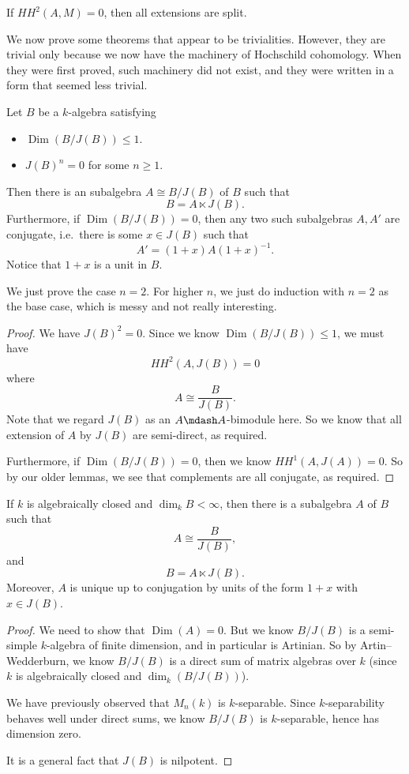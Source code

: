 \documentclass[a4paper]{article}
\DeclareMathOperator\Dim{Dim}
\newcommand\HH{H\!H}
\begin{document}
\begin{cor}
  If $\HH^2(A, M) = 0$, then all extensions are split.
\end{cor}

We now prove some theorems that appear to be trivialities. However, they are trivial only because we now have the machinery of Hochschild cohomology. When they were first proved, such machinery did not exist, and they were written in a form that seemed less trivial.
\begin{thm}
  Let $B$ be a $k$-algebra satisfying
  \begin{itemize}
    \item $\Dim (B/J(B)) \leq 1$.
    \item $J(B)^n = 0$ for some $n \geq 1$.
  \end{itemize}
  Then there is an subalgebra $A \cong B/J(B)$ of $B$ such that
  \[
    B = A \ltimes J(B).
  \]
  Furthermore, if $\Dim (B/J(B)) = 0$, then any two such subalgebras $A, A'$ are conjugate, i.e.\ there is some $x \in J(B)$ such that
  \[
    A' = (1 + x) A (1 + x)^{-1}.
  \]
  Notice that $1 + x$ is a unit in $B$.
\end{thm}

We just prove the case $n = 2$. For higher $n$, we just do induction with $n = 2$ as the base case, which is messy and not really interesting.

\begin{proof}
  We have $J(B)^2 = 0$. Since we know $\Dim (B/J(B)) \leq 1$, we must have
  \[
    \HH^2(A, J(B)) = 0
  \]
  where
  \[
    A \cong \frac{B}{J(B)}.
  \]
  Note that we regard $J(B)$ as an $A\mdash A$-bimodule here. So we know that all extension of $A$ by $J(B)$ are semi-direct, as required.

  Furthermore, if $\Dim (B/J(B)) = 0$, then we know $\HH^1(A, J(A)) = 0$. So by our older lemmas, we see that complements are all conjugate, as required.
\end{proof}

\begin{cor}
  If $k$ is algebraically closed and $\dim_k B < \infty$, then there is a subalgebra $A$ of $B$ such that
  \[
    A \cong \frac{B}{J(B)},
  \]
  and
  \[
    B = A \ltimes J(B).
  \]
  Moreover, $A$ is unique up to conjugation by units of the form $1 + x$ with $x \in J(B)$.
\end{cor}

\begin{proof}
  We need to show that $\Dim (A) = 0$. But we know $B/J(B)$ is a semi-simple $k$-algebra of finite dimension, and in particular is Artinian. So by Artin--Wedderburn, we know $B/J(B)$ is a direct sum of matrix algebras over $k$ (since $k$ is algebraically closed and $\dim_k(B/J(B))$).

  We have previously observed that $M_n(k)$ is $k$-separable. Since $k$-separability behaves well under direct sums, we know $B/J(B)$ is $k$-separable, hence has dimension zero.

  It is a general fact that $J(B)$ is nilpotent.
\end{proof}
\end{document}
